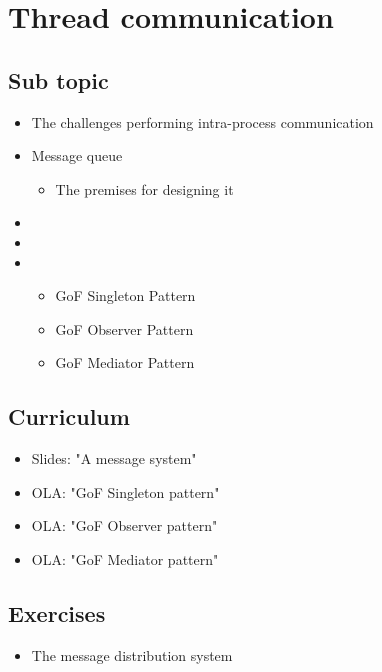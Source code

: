 \section{Thread communication}

\subsection{Sub topic}

\begin{itemize}
	\item The challenges performing intra-process communication
	\item Message queue
	\begin{itemize}
		\item The premises for designing it
	\end{itemize}	
	\item 
	\item 
	\item 
	\begin{itemize}
		\item GoF Singleton Pattern
		\item GoF Observer Pattern
		\item GoF Mediator Pattern
	\end{itemize}
\end{itemize}

\subsection{Curriculum}

\begin{itemize}
	\item Slides: "A message system"
	\item OLA: "GoF Singleton pattern"
	\item OLA: "GoF Observer pattern"
	\item OLA: "GoF Mediator pattern"
\end{itemize}

\subsection{Exercises}

\begin{itemize}
	\item The message distribution system
\end{itemize}


